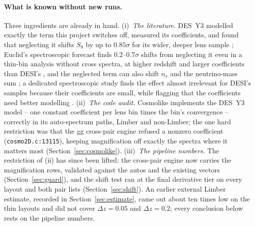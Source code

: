 \documentclass[11pt]{article}
\begin{document}
\paragraph{What is known without new runs.}
Three ingredients are already in hand.  (i)~\emph{The literature.}
DES~Y3 modelled exactly the term this project switches off, measured
its coefficients, and found that neglecting it shifts $S_8$ by up to
$0.85\sigma$ for its wider, deeper lens sample
\cite{ElvinPoole2022, KrauseY3}; Euclid's spectroscopic forecast finds
$0.2$--$0.7\sigma$ shifts from neglecting it even in a thin-bin
analysis without cross spectra, at higher redshift and larger
coefficients than DESI's \cite{EuclidSpectroMag}, and the neglected
term can also shift $n_s$ and the neutrino-mass sum
\cite{Cardona2016}; a dedicated
spectroscopic study finds the effect almost irrelevant for DESI's
samples because their coefficients are small, while flagging that the
coefficients need better modelling \cite{JelicCizmek2021}.
(ii)~\emph{The code audit.}  Cosmolike implements the DES~Y3 model --
one constant coefficient per lens bin times the bin's convergence --
correctly in its auto-spectrum paths, Limber and non-Limber; the one
hard restriction was that the gg cross-pair engine refused a nonzero
coefficient (\texttt{cosmo2D.c:13115}), keeping magnification off
exactly the spectra where it matters most
(Section~\ref{sec:cosmolike}).  (iii)~\emph{The pipeline numbers.}
The restriction of (ii) has since been lifted: the cross-pair engine
now carries the magnification rows, validated against the autos and
the existing vectors (Section~\ref{sec:guard}), and the shift test
ran at the final derivative tier on every layout and both pair lists
(Section~\ref{sec:shift}).  An earlier external Limber estimate,
recorded in Section~\ref{sec:estimate}, came out about ten times low
on the thin layouts and did not cover $\Delta z = 0.05$ and
$\Delta z = 0.2$; every conclusion below rests on the pipeline
numbers.
\end{document}
